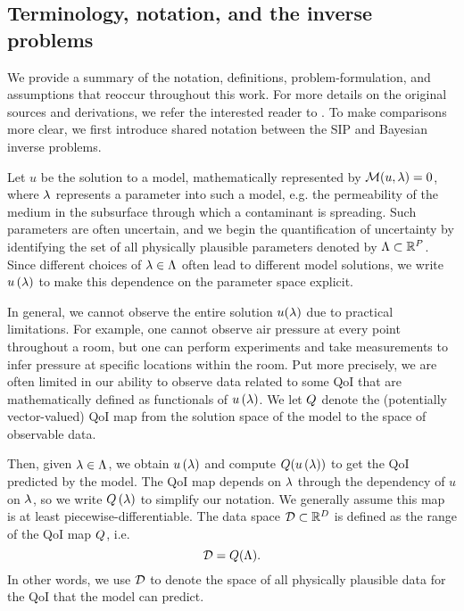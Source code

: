 \subsection{Terminology, notation, and the inverse problems}
We provide a summary of the notation, definitions, problem-formulation, and assumptions that reoccur throughout this work.
For more details on the original sources and derivations,  we refer the interested reader to \cite{BES12, BE13, BET+14, BJW18a, BWY20}.
To make comparisons more clear, we first introduce shared notation between the SIP and Bayesian inverse problems.


Let $u$ be the solution to a model, mathematically represented by $\mathcal{M}(u, \lambda) = 0$, where $\lambda$ represents a parameter into such a model, e.g. the permeability of the medium in the subsurface through which a contaminant is spreading.
Such parameters are often uncertain, and we begin the quantification of uncertainty by identifying the set of all physically plausible parameters denoted by ${\Lambda}\subset\mathbb{R}^P$.
Since different choices of $\lambda \in {\Lambda}$ often lead to different model solutions, we write $u\left ( \lambda \right )$ to make this dependence on the parameter space explicit.

In general, we cannot observe the entire solution $u(\lambda)$ due to practical limitations.
For example, one cannot observe air pressure at every point throughout a room, but one can perform experiments and take measurements to infer pressure at specific locations within the room.
Put more precisely, we are often limited in our ability to observe data related to some QoI that are mathematically defined as functionals of $u\left ( \lambda \right )$.
We let $Q$ denote the (potentially vector-valued) QoI map from the solution space of the model to the space of observable data.

Then, given $\lambda \in {\Lambda}$, we obtain $u\left ( \lambda \right )$ and compute $Q(u\left ( \lambda \right ))$ to get the QoI predicted by the model.
The QoI map depends on $\lambda$ through the dependency of $u$ on $\lambda$, so we write $Q\left ( \lambda \right )$ to simplify our notation.
We generally assume this map is at least piecewise-differentiable.
The data space $\mathcal{D} \subset \mathbb{R}^D$ is defined as the range of the QoI map $Q$, i.e.
\[
\mathcal{D} = Q({\Lambda}).
\]
In other words, we use $\mathcal{D}$ to denote the space of all physically plausible data for the QoI that the model can predict.


